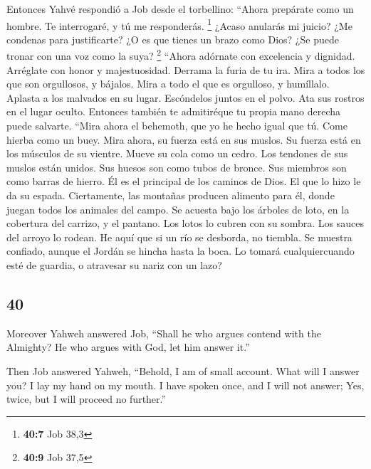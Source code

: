 \begin{paracol}{2}
 Entonces Yahvé respondió a Job desde el torbellino:
 ``Ahora prepárate como un hombre. Te interrogaré, y tú me
responderás. \footnote{\textbf{40:7} Job 38,3}  ¿Acaso
anularás mi juicio? ¿Me condenas para justificarte?  ¿O es
que tienes un brazo como Dios? ¿Se puede tronar con una voz como la
suya? \footnote{\textbf{40:9} Job 37,5}  ``Ahora adórnate
con excelencia y dignidad. Arréglate con honor y majestuosidad.
 Derrama la furia de tu ira. Mira a todos los que son
orgullosos, y bájalos.  Mira a todo el que es orgulloso,
y humíllalo. Aplasta a los malvados en su lugar. 
Escóndelos juntos en el polvo. Ata sus rostros en el lugar oculto.
 Entonces también te admitiréque tu propia mano derecha
puede salvarte.  ``Mira ahora el behemoth, que yo he
hecho igual que tú. Come hierba como un buey.  Mira
ahora, su fuerza está en sus muslos. Su fuerza está en los músculos de
su vientre.  Mueve su cola como un cedro. Los tendones de
sus muslos están unidos.  Sus huesos son como tubos de
bronce. Sus miembros son como barras de hierro.  Él es el
principal de los caminos de Dios. El que lo hizo le da su espada.
 Ciertamente, las montañas producen alimento para él,
donde juegan todos los animales del campo.  Se acuesta
bajo los árboles de loto, en la cobertura del carrizo, y el pantano.
 Los lotos lo cubren con su sombra. Los sauces del arroyo
lo rodean.  He aquí que si un río se desborda, no
tiembla. Se muestra confiado, aunque el Jordán se hincha hasta la boca.
 Lo tomará cualquiercuando esté de guardia, o atravesar
su nariz con un lazo?

\switchcolumn
\begin{otherlanguage}{english}

\hypertarget{section-79}{%
\section{40}\label{section-79}}

 Moreover Yahweh answered Job,  ``Shall he
who argues contend with the Almighty? He who argues with God, let him
answer it.''

 Then Job answered Yahweh,  ``Behold, I am
of small account. What will I answer you? I lay my hand on my mouth.
 I have spoken once, and I will not answer; Yes, twice,
but I will proceed no further.''


\end{otherlanguage}
\end{paracol}
